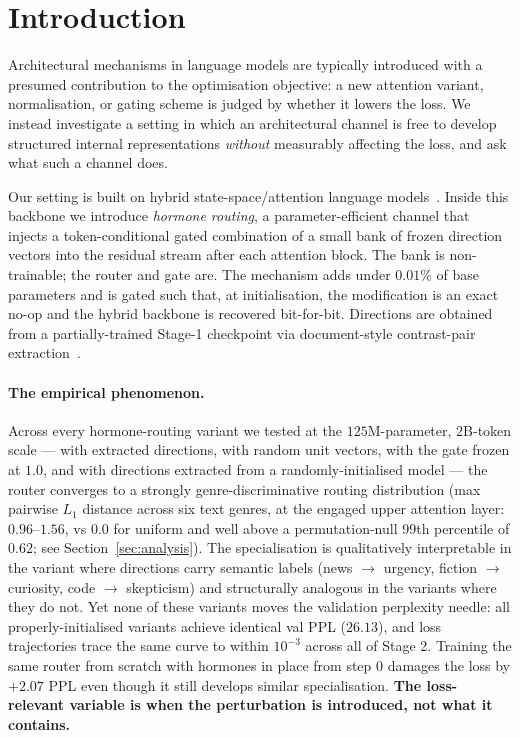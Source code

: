 \section{Introduction}
\label{sec:intro}

Architectural mechanisms in language models are typically introduced with a presumed contribution to the optimisation objective: a new attention variant, normalisation, or gating scheme is judged by whether it lowers the loss. We instead investigate a setting in which an architectural channel is free to develop structured internal representations \emph{without} measurably affecting the loss, and ask what such a channel does.

Our setting is built on hybrid state-space/attention language models~\citep{gu2023mamba,vaswani2017attention,lieber2024jamba,glorioso2024zamba,park2024empirical}. Inside this backbone we introduce \emph{hormone routing}, a parameter-efficient channel that injects a token-conditional gated combination of a small bank of frozen direction vectors into the residual stream after each attention block. The bank is non-trainable; the router and gate are. The mechanism adds under $0.01\%$ of base parameters and is gated such that, at initialisation, the modification is an exact no-op and the hybrid backbone is recovered bit-for-bit. Directions are obtained from a partially-trained Stage-1 checkpoint via document-style contrast-pair extraction~\citep{turner2023activation,rimsky2024steering,zou2023representation}.

\paragraph{The empirical phenomenon.} Across every hormone-routing variant we tested at the $125$M-parameter, $2$B-token scale --- with extracted directions, with random unit vectors, with the gate frozen at $1.0$, and with directions extracted from a randomly-initialised model --- the router converges to a strongly genre-discriminative routing distribution (max pairwise $L_1$ distance across six text genres, at the engaged upper attention layer: $0.96$--$1.56$, vs $0.0$ for uniform and well above a permutation-null 99th percentile of $0.62$; see Section~\ref{sec:analysis}). The specialisation is qualitatively interpretable in the variant where directions carry semantic labels (news $\to$ urgency, fiction $\to$ curiosity, code $\to$ skepticism) and structurally analogous in the variants where they do not. Yet none of these variants moves the validation perplexity needle: all properly-initialised variants achieve identical val PPL ($26.13$), and loss trajectories trace the same curve to within $10^{-3}$ across all of Stage 2. Training the same router from scratch with hormones in place from step $0$ damages the loss by $+2.07$ PPL even though it still develops similar specialisation. \textbf{The loss-relevant variable is when the perturbation is introduced, not what it contains.}

